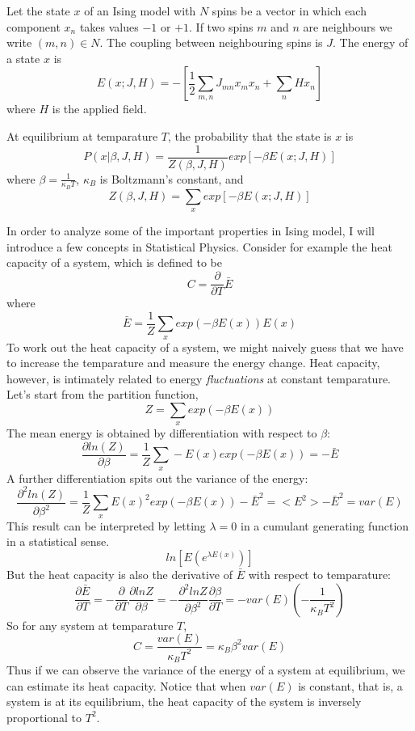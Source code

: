 \documentclass[openany]{memoir}
\begin{document}
Let the state $x$ of an Ising model with $N$ spins be a vector in which each component $x_n$ takes values $-1$ or $+1$. If two spins $m$ and $n$ are neighbours we write $(m,n) \in N$. The coupling between neighbouring spins is $J$. The energy of a state $x$ is
$$E(x;J,H) = -\left[\frac{1}{2}\sum_{m,n} J_{mn}x_{m}x_{n} + \sum_{n}Hx_n\right]$$
where $H$ is the applied field. 

At equilibrium at temparature $T$, the probability that the state is $x$ is
$$P(x | \beta, J, H)= \frac{1}{Z(\beta,J,H)} exp[- \beta E(x;J,H)]$$
where $\beta=\frac{1}{\kappa_{B}T}$, $\kappa_{B}$ is Boltzmann's constant, and
$$Z(\beta, J, H) = \sum_{x} exp[-\beta E(x;J,H)]$$

In order to analyze some of the important properties in Ising model, I will introduce a few concepts in Statistical Physics. Consider for example the heat capacity of a system, which is defined to be
$$C = \frac{\partial}{\partial T} \bar{E}$$
where
$$\bar{E} = \frac{1}{Z} \sum_{x} exp(-\beta E(x))E(x)$$
To work out the heat capacity of a system, we might naively guess that we have to increase the temparature and measure the energy change. Heat capacity, however, is intimately related to energy \textit{fluctuations} at constant temparature. Let's start from the partition function,
$$Z = \sum_{x} exp(-\beta E(x))$$
The mean energy is obtained by differentiation with respect to $\beta$:
$$\frac{\partial ln(Z)}{\partial \beta}  = \frac{1}{Z} \sum_{x} -E(x) exp(-\beta E(x)) = -\bar{E}$$
A further differentiation spits out the variance of the energy:
$$\frac{\partial^2 ln(Z)}{\partial \beta^2} = \frac{1}{Z} \sum_{x} E(x)^2 exp(-\beta E(x)) - \bar{E}^2 = <E^2> - \bar{E}^2 = var(E)$$
This result can be interpreted by letting $\lambda = 0$ in a cumulant generating function in a statistical sense.
$$ln\left[E(e^{\lambda E(x)})\right]$$
But the heat capacity is also the derivative of $\bar{E}$ with respect to temparature:
$$\frac{\partial \bar{E}}{\partial T} = -\frac{\partial}{\partial T}\frac{\partial lnZ}{\partial \beta} = -\frac{\partial^2 lnZ}{\partial \beta^2}\frac{\partial \beta}{\partial T} = -var(E)\left(-\frac{1}{\kappa_{B} T^2}\right)$$
So for any system at temparature $T$,
$$C = \frac{var(E)}{\kappa_{B} T^2} = \kappa_{B} \beta^2 var(E)$$
Thus if we can observe the variance of the energy of a system at equilibrium, we can estimate its heat capacity. Notice that when $var(E)$ is constant, that is, a system is at its equilibrium, the heat capacity of the system is inversely proportional to $T^2$.
\end{document}

